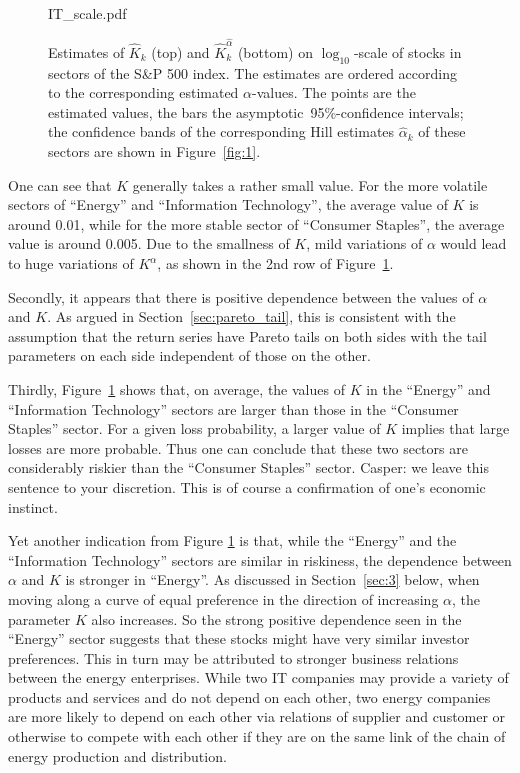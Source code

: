 \documentclass[11pt,a4]{amsart}
\newcommand{\red}{\color{darkred}}
\newcommand{\asy}{asymptotic}
\newcommand{\pro}{probabilit}
\newcommand{\1}{{\mathbf 1}}
\begin{document}
\begin{figure}[htb!]
\begin{minipage}{0.33\linewidth}
    {IT_scale.pdf}
  \end{minipage}
  \caption{\small Estimates of $\hat K_k$ (top) and $\hat K_k^{\hat
      \alpha}$ (bottom) on $\log_{10}$-scale of stocks in sectors
    of the S\&P 500 index. The estimates are ordered according to the 
    corresponding estimated $\alpha$-values.
    The points are the estimated values, the bars 
    the \asy\ 95\%-confidence intervals; the confidence bands of the
    corresponding Hill estimates $\hat \alpha_k$ of these sectors are
    shown in Figure~\ref{fig:1}. 
  }
  \label{fig:sectors_parameters}
\end{figure}
One can see that $K$ generally takes a rather small value. For the
more volatile sectors of ``Energy'' and ``Information Technology'',
the average value of $K$ is around 0.01, while for the more stable
sector of ``Consumer Staples'', the average value is around 0.005. Due
to the smallness of $K$, mild variations of $\alpha$ would lead to
huge variations of $K^\alpha$, as shown in the 2nd row of
Figure~\ref{fig:sectors_parameters}.
\par
Secondly, it appears that there is positive dependence between the
values of $\alpha$ and $K$.
As argued in Section~\ref{sec:pareto_tail}, this is consistent with
the assumption that the return series have Pareto tails on both sides
with the tail parameters on each side independent of those on the
other.

\par
Thirdly, Figure~\ref{fig:sectors_parameters} shows that, on
average, the values of $K$
in the ``Energy'' and ``Information Technology'' sectors are  larger
than those in the ``Consumer Staples'' sector.  For a given loss \pro y, 
a larger value of $K$ implies that large losses are more
probable. Thus one can conclude that these two sectors are
considerably riskier than the ``Consumer Staples'' sector. {\red Casper:
we leave this sentence to your discretion.} This is of course a
confirmation of one's economic instinct.

Yet another indication from Figure \ref{fig:sectors_parameters} is
that, while the ``Energy'' and the ``Information Technology'' sectors
are similar in riskiness, the dependence  between $\alpha$ and $K$ is
stronger in ``Energy''. As discussed in Section~\ref{sec:3} below, when moving along
a curve of equal preference in the direction of increasing $\alpha$, the parameter $K$ also
increases. So the strong positive dependence seen in the ``Energy''
sector suggests that these stocks might have very similar investor
preferences. This in turn may be attributed to stronger business
relations between the energy enterprises. While two IT companies
may provide a variety of products and services and do not depend on each
other, two energy companies are more likely to depend on each other
via relations of supplier and customer or otherwise to compete with each
other if they are on the same link of the chain of energy production
and distribution.
\end{document}
